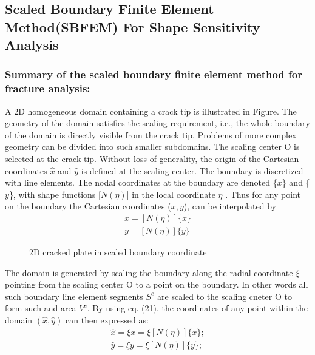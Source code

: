 \documentclass[12pt]{article}
\begin{document}
\subsection{Scaled Boundary Finite Element Method(SBFEM) For Shape Sensitivity Analysis}
\subsubsection{Summary of the scaled boundary finite element method for fracture analysis:\\}A 2D homogeneous domain containing a crack tip is illustrated in Figure. The geometry of the domain satisfies the scaling
requirement, i.e., the whole boundary of the domain is directly visible from the crack tip. Problems of more complex 
geometry can be divided into such smaller subdomains.
The scaling center O is selected at the crack tip.
Without loss of generality, the origin of the Cartesian coordinates $\hat{x}$ and $\hat{y}$
is defined at the scaling center. The boundary is discretized with line elements. The nodal coordinates at the boundary
are denoted \{$x$\} and \{$y$\},
with shape functions [$N( \eta )$] in the local coordinate $\eta$ . Thus for any point on the boundary the Cartesian 
coordinates ($x, y$), can be interpolated by 
\begin{align*}
    x = [N(\eta)]\{x\}\\
    y = [N(\eta)]\{y\} \tag{21} \label{21}
\end{align*}
\begin{figure}[H]
    \centering
    \captionsetup{labelformat=empty}
    \caption{2D cracked plate in scaled boundary coordinate}  
\end{figure}

The domain is generated by scaling the boundary along the radial coordinate $\xi$ 
pointing from the scaling center O to a point
on the boundary. In other words all such boundary line element segments
$S^e$ are scaled to the scaling cneter O to form such and area $V^e$. By using eq. (21), the coordinates of any point within the domain $(\hat{x}, \hat{y})$
can then expressed as:
\begin{align*}
    \hat{x} = \xi x = \xi [N(\eta)]\{x\};\\
    \hat{y} = \xi y = \xi [N(\eta)]\{y\}; \tag{22} \label{22}
\end{align*}
\end{document}
